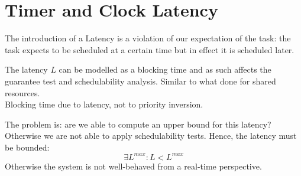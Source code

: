 \chapter{Timer and Clock Latency}
The introduction of a Latency is a violation of our expectation of the task: the task expects to be scheduled at a certain time but in effect it is scheduled later.

The latency $L$ can be modelled as a blocking time and as such affects the guarantee test and schedulability analysis.
Similar to what done for shared resources. \\
Blocking time due to latency, not to priority inversion.

The problem is: are we able to compute an upper bound for this latency? Otherwise we are not able to apply schedulability tests. Hence, the latency must be bounded:
\[\exists L^{max}: L < L^{max}\]
Otherwise the system is not well-behaved from a real-time perspective.


